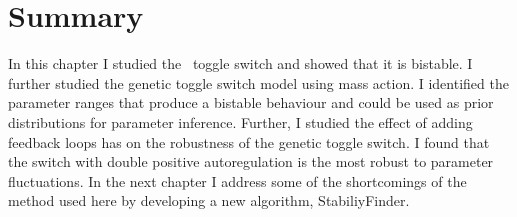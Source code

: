 	

\section{Summary}

In this chapter I studied the~\textcite{Gardner:2000vha} toggle switch and showed that it is bistable. I further studied the genetic toggle switch model using mass action. I identified the parameter ranges that produce a bistable behaviour and could be used as prior distributions for parameter inference. Further, I studied the effect of adding feedback loops has on the robustness of the genetic toggle switch. I found that the switch with double positive autoregulation is the most robust to parameter fluctuations. In the next chapter I address some of the shortcomings of the method used here by developing a new algorithm, StabiliyFinder. 


